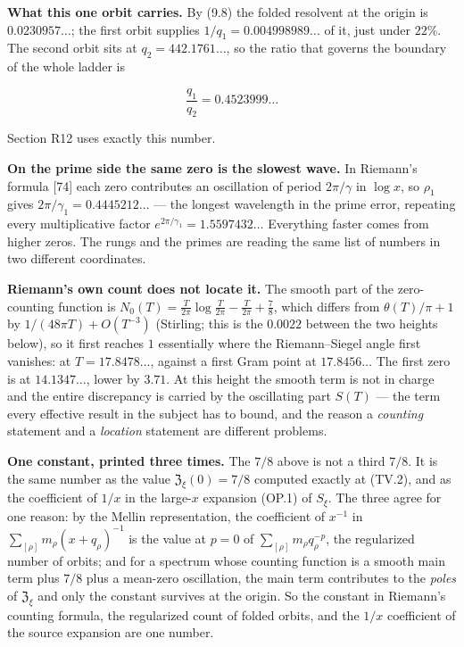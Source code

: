 \documentclass[
  11pt,
]{book}
\begin{document}
\textbf{What this one orbit carries.} By (9.8) the folded resolvent at
the origin is \(0.0230957\ldots\); the first orbit supplies
\(1/q_1=0.004998989\ldots\) of it, just under \(22\%\). The second orbit
sits at \(q_2=442.1761\ldots\), so the ratio that governs the boundary
of the whole ladder is

\[
\frac{q_1}{q_2}=0.4523999\ldots
\tag{9.10}
\]

Section R12 uses exactly this number.

\textbf{On the prime side the same zero is the slowest wave.} In
Riemann's formula {[}74{]} each zero contributes an oscillation of
period \(2\pi/\gamma\) in \(\log x\), so \(\rho_1\) gives
\(2\pi/\gamma_1=0.4445212\ldots\) --- the longest wavelength in the
prime error, repeating every multiplicative factor
\(e^{2\pi/\gamma_1}=1.5597432\ldots\) Everything faster comes from
higher zeros. The rungs and the primes are reading the same list of
numbers in two different coordinates.

\textbf{Riemann's own count does not locate it.} The smooth part of the
zero-counting function is
\(N_0(T)=\frac{T}{2\pi}\log\frac{T}{2\pi}-\frac{T}{2\pi}+\frac78\),
which differs from \(\theta(T)/\pi+1\) by \(1/(48\pi T)+O(T^{-3})\)
(Stirling; this is the \(0.0022\) between the two heights below), so it
first reaches \(1\) essentially where the Riemann--Siegel angle first
vanishes: at \(T=17.8478\ldots\), against a first Gram point at
\(17.8456\ldots\) The first zero is at \(14.1347\ldots\), lower by
\(3.71\). At this height the smooth term is not in charge and the entire
discrepancy is carried by the oscillating part \(S(T)\) --- the term
every effective result in the subject has to bound, and the reason a
\emph{counting} statement and a \emph{location} statement are different
problems.

\textbf{One constant, printed three times.} The \(7/8\) above is not a
third \(7/8\). It is the same number as the value
\(\mathfrak Z_\xi(0)=7/8\) computed exactly at (TV.2), and as the
coefficient of \(1/x\) in the large-\(x\) expansion (OP.1) of \(S_\xi\).
The three agree for one reason: by the Mellin representation, the
coefficient of \(x^{-1}\) in \(\sum_{[\rho]}m_\rho(x+q_\rho)^{-1}\) is
the value at \(p=0\) of \(\sum_{[\rho]}m_\rho q_\rho^{-p}\), the
regularized number of orbits; and for a spectrum whose counting function
is a smooth main term plus \(7/8\) plus a mean-zero oscillation, the
main term contributes to the \emph{poles} of \(\mathfrak Z_\xi\) and
only the constant survives at the origin. So the constant in Riemann's
counting formula, the regularized count of folded orbits, and the
\(1/x\) coefficient of the source expansion are one number.
\end{document}

